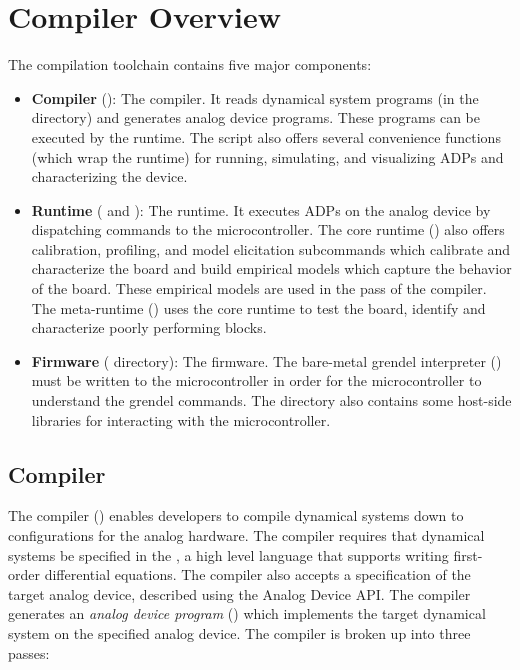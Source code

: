 \chapter{Compiler Overview}

The compilation toolchain contains five major components:

\begin{itemize}
\item\textbf{Compiler} (): The compiler. It reads dynamical system
  programs (in the  directory) and generates analog device programs.
  These programs can be executed by the runtime. The  script also
  offers several convenience functions (which wrap the runtime) for running,
  simulating, and visualizing ADPs and characterizing the device. 
  
\item\textbf{Runtime} ( and ): The runtime.
  It executes ADPs on the analog device by dispatching commands to the
  microcontroller. The core runtime () also offers calibration,
  profiling, and model elicitation subcommands which calibrate and characterize
  the board and build empirical models which capture the behavior of the board.
  These empirical models are used in the  pass of the compiler.
  The meta-runtime () uses the core runtime to test the
  board, identify and characterize poorly performing blocks.
  
\item\textbf{Firmware} ( directory): The firmware. The bare-metal
  grendel interpreter () must be
  written to the microcontroller in order for the microcontroller to understand
  the grendel commands. The  directory also contains some
  host-side libraries for interacting with the microcontroller.
 
\end{itemize}


\section{\legno Compiler}

The \legno compiler () enables developers to compile dynamical
systems down to configurations for the analog hardware. The \legno compiler
requires that dynamical systems be specified in the , a high level language that supports writing first-order
differential equations. The \legno compiler also accepts a specification of the
target analog device, described using the Analog Device API. The \legno compiler
generates an \textit{analog device program} () which implements the target dynamical
system on the specified analog device. The compiler is broken up into three
passes:

